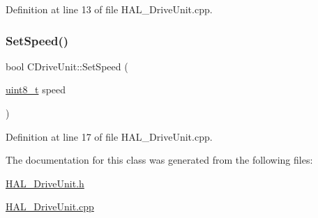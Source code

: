 Definition at line 13 of file H\+A\+L\+\_\+\+Drive\+Unit.\+cpp.

\mbox{\label{class_c_drive_unit_a06ffeb71565bc8edabadae09157c705e}} 
\subsubsection{\texorpdfstring{Set\+Speed()}{SetSpeed()}}
{\footnotesize\ttfamily bool C\+Drive\+Unit\+::\+Set\+Speed (\begin{DoxyParamCaption}\item[{\mbox{\hyperlink{_a_d_a_s___types_8h_aba7bc1797add20fe3efdf37ced1182c5}{uint8\+\_\+t}}}]{speed }\end{DoxyParamCaption})}



Definition at line 17 of file H\+A\+L\+\_\+\+Drive\+Unit.\+cpp.



The documentation for this class was generated from the following files\+:\begin{DoxyCompactItemize}
\item 
\mbox{\hyperlink{_h_a_l___drive_unit_8h}{H\+A\+L\+\_\+\+Drive\+Unit.\+h}}\item 
\mbox{\hyperlink{_h_a_l___drive_unit_8cpp}{H\+A\+L\+\_\+\+Drive\+Unit.\+cpp}}\end{DoxyCompactItemize}
